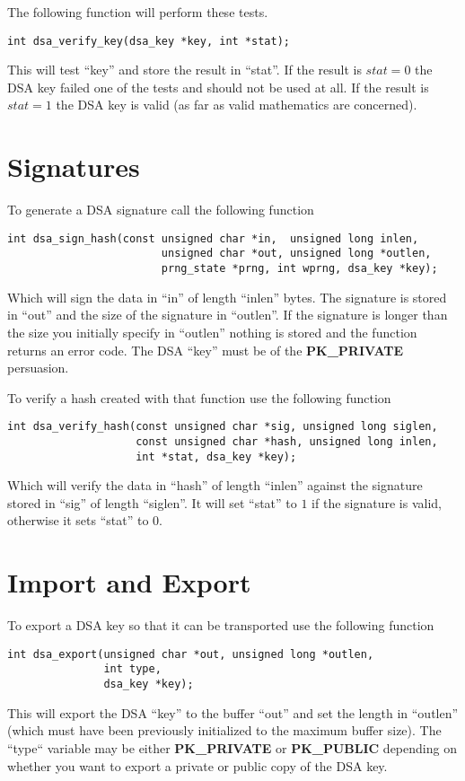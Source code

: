 \documentclass[a4paper]{book}
\begin{document}
The following function will perform these tests.

\begin{verbatim}
int dsa_verify_key(dsa_key *key, int *stat);
\end{verbatim}

This will test ``key'' and store the result in ``stat''.  If the result is $stat = 0$ the DSA key failed one of the tests
and should not be used at all.  If the result is $stat = 1$ the DSA key is valid (as far as valid mathematics are concerned).

\section{Signatures}
To generate a DSA signature call the following function

\begin{verbatim}
int dsa_sign_hash(const unsigned char *in,  unsigned long inlen,
                        unsigned char *out, unsigned long *outlen,
                        prng_state *prng, int wprng, dsa_key *key);
\end{verbatim}

Which will sign the data in ``in'' of length ``inlen'' bytes.  The signature is stored in ``out'' and the size
of the signature in ``outlen''.  If the signature is longer than the size you initially specify in ``outlen'' nothing
is stored and the function returns an error code.  The DSA ``key'' must be of the \textbf{PK\_PRIVATE} persuasion.

To verify a hash created with that function use the following function

\begin{verbatim}
int dsa_verify_hash(const unsigned char *sig, unsigned long siglen,
                    const unsigned char *hash, unsigned long inlen, 
                    int *stat, dsa_key *key);
\end{verbatim}
Which will verify the data in ``hash'' of length ``inlen'' against the signature stored in ``sig'' of length ``siglen''.  
It will set ``stat'' to $1$ if the signature is valid, otherwise it sets ``stat'' to $0$.  

\section{Import and Export}

To export a DSA key so that it can be transported use the following function
\begin{verbatim}
int dsa_export(unsigned char *out, unsigned long *outlen, 
               int type, 
               dsa_key *key);
\end{verbatim}
This will export the DSA ``key'' to the buffer ``out'' and set the length in ``outlen'' (which must have been previously
initialized to the maximum buffer size).  The ``type`` variable may be either \textbf{PK\_PRIVATE} or \textbf{PK\_PUBLIC}
depending on whether you want to export a private or public copy of the DSA key.
\end{document}

